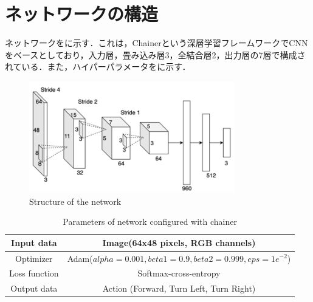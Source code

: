 
\section{ネットワークの構造}

  ネットワークをに示す．これは，Chainer\cite{chainer}という深層学習フレームワークでCNNをベースとしており，入力層，畳み込み層3，全結合層2，出力層の7層で構成されている．また，ハイパーパラメータをに示す．

  \begin{figure}[h]
    \centering
    \includegraphics[keepaspectratio, scale=0.70] {images/okada_network.png}
    \caption{Structure of the network \cite{okada}}
    \label{Fig:okada_network}
  \end{figure}

  \begin{table}[hbtp]
    \caption{Parameters of network configured with chainer}
    \label{tab:Parameters of network configured with chainer}
    \centering
    \begin{tabular}{|c|c|}
      \hline
      Input data & Image(64x48 pixels, RGB channels) \\
      \hline
      Optimizer & Adam($alpha = 0.001, beta1 = 0.9, beta2 =  0.999, eps = 1e^{-2}$)\\
      \hline
      Loss function & Softmax-cross-entropy\\
      \hline
      Output data & Action (Forward, Turn Left, Turn Right)\\
      \hline
    \end{tabular}
  \end{table}

\newpage
